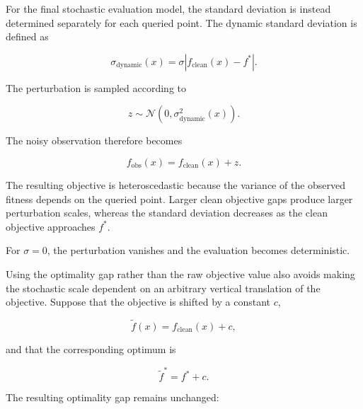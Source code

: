 
For the final stochastic evaluation model, the standard deviation is instead
determined separately for each queried point. The dynamic standard deviation
is defined as

\begin{equation}
\sigma_{\mathrm{dynamic}}(x)
=
\sigma
\left|
f_{\mathrm{clean}}(x) - f^*
\right|.
\label{eq:dynamic_noise_std}
\end{equation}

The perturbation is sampled according to

\begin{equation}
z
\sim
\mathcal{N}
\left(
0,
\sigma_{\mathrm{dynamic}}^2(x)
\right).
\label{eq:proportional_gaussian_noise}
\end{equation}

The noisy observation therefore becomes

\begin{equation}
f_{\mathrm{obs}}(x)
=
f_{\mathrm{clean}}(x) + z.
\label{eq:heteroscedastic_objective}
\end{equation}

The resulting objective is heteroscedastic because the variance of the
observed fitness depends on the queried point. Larger clean objective gaps
produce larger perturbation scales, whereas the standard deviation decreases
as the clean objective approaches $f^*$.

For $\sigma = 0$, the perturbation vanishes and the evaluation becomes
deterministic.

Using the optimality gap rather than the raw objective value also avoids
making the stochastic scale dependent on an arbitrary vertical translation of
the objective. Suppose that the objective is shifted by a constant $c$,

\begin{equation}
\tilde{f}(x)
=
f_{\mathrm{clean}}(x) + c,
\end{equation}

and that the corresponding optimum is

\begin{equation}
\tilde{f}^{*}
=
f^* + c.
\end{equation}

The resulting optimality gap remains unchanged:

